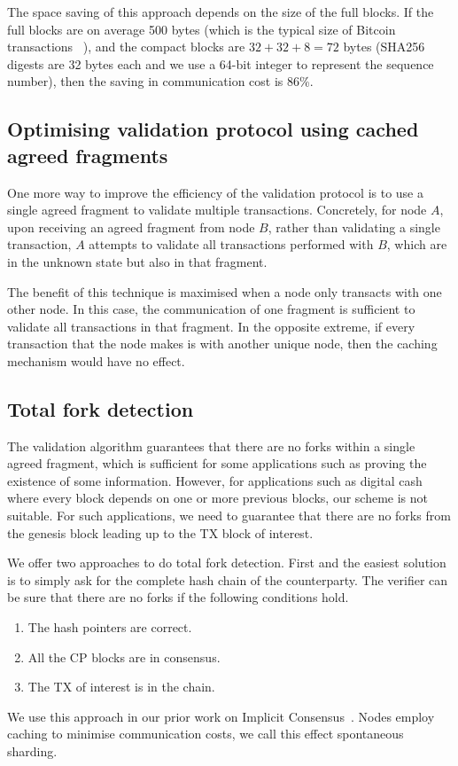 The space saving of this approach depends on the size of the full blocks.
If the full blocks are on average 500 bytes
(which is the typical size of Bitcoin transactions ~\cite{txsize}),
and the compact blocks are $32 + 32 + 8 = 72$ bytes
(SHA256 digests are 32 bytes each and we use a 64-bit integer to represent the sequence number),
then the saving in communication cost is 86\%.


\subsection{Optimising validation protocol using cached agreed fragments}
\label{sec:caching}
One more way to improve the efficiency of the validation protocol is to use a single agreed fragment to validate multiple transactions.
Concretely, for node $A$, upon receiving an agreed fragment from node $B$,
rather than validating a single transaction,
$A$ attempts to validate all transactions performed with $B$, which are in the unknown state but also in that fragment.

The benefit of this technique is maximised when a node only transacts with one other node.
In this case, the communication of one fragment is sufficient to validate all transactions in that fragment.
In the opposite extreme, if every transaction that the node makes is with another unique node,
then the caching mechanism would have no effect.

\subsection{Total fork detection}
The validation algorithm guarantees that there are no forks within a single agreed fragment,
which is sufficient for some applications such as proving the existence of some information.
However, for applications such as digital cash where every block depends on one or more previous blocks,
our scheme is not suitable.
For such applications, we need to guarantee that there are no forks from the genesis block leading up to the TX block of interest.

We offer two approaches to do total fork detection.
First and the easiest solution is to simply ask for the complete hash chain of the counterparty.
The verifier can be sure that there are no forks if the following conditions hold.
\begin{enumerate}
    \item The hash pointers are correct.
    \item All the CP blocks are in consensus.
    \item The TX of interest is in the chain.
\end{enumerate}
We use this approach in our prior work on Implicit Consensus~\cite{implicitconsensus}.
Nodes employ caching to minimise communication costs, we call this effect spontaneous sharding.

